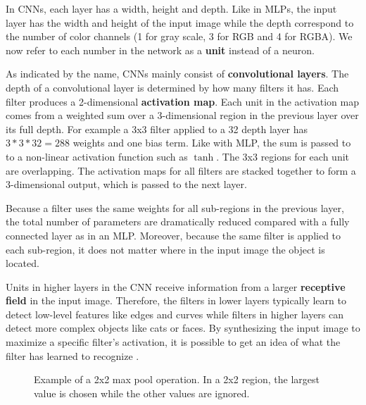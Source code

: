 
In CNNs, each layer has a width, height and depth. Like in MLPs, the input layer has the width and height of the input image while the depth correspond to the number of color channels (1 for gray scale, 3 for RGB and 4 for RGBA). We now refer to each number in the network as a \textbf{unit} instead of a neuron.

As indicated by the name, CNNs mainly consist of \textbf{convolutional layers}. The depth of a convolutional layer is determined by how many filters it has. Each filter produces a 2-dimensional \textbf{activation map}. Each unit in the activation map comes from a weighted sum over a 3-dimensional region in the previous layer over its full depth. For example a 3x3 filter applied to a 32 depth layer has $3*3*32=288$ weights and one bias term.
Like with MLP, the sum is passed to to a non-linear activation function such as $\tanh$. The 3x3 regions for each unit are overlapping.
The activation maps for all filters are stacked together to form a 3-dimensional output, which is passed to the next layer.

Because a filter uses the same weights for all sub-regions in the previous layer, the total number of parameters are dramatically reduced compared with a fully connected layer as in an MLP. Moreover, because the same filter is applied to each sub-region, it does not matter where in the input image the object is located.

Units in higher layers in the CNN receive information from a larger \textbf{receptive field} in the input image. Therefore, the filters in lower layers typically learn to detect low-level features like edges and curves while filters in higher layers can detect more complex objects like cats or faces.
By synthesizing the input image to maximize a specific filter's activation, it is possible to get an idea of what the filter has learned to recognize \cite{VisualizeCnn}.

\begin{figure}
\centering
{}

\label{fig:maxpool}
\caption{Example of a 2x2 max pool operation. In a 2x2 region, the largest value is chosen while the other values are ignored.}
\end{figure}

